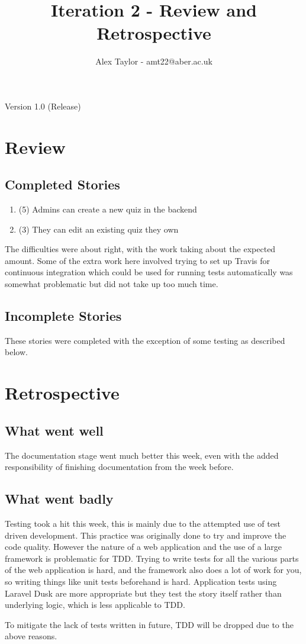 \documentclass{article}
\title{Iteration 2 - Review and Retrospective}
\author{Alex Taylor - amt22@aber.ac.uk}
\begin{document}
\maketitle
\begin{center}
	Version 1.0 (Release)
\end{center}
\thispagestyle{empty}
\newpage

\section{Review}
\subsection{Completed Stories}
\begin{enumerate}
	\item (5) Admins can create a new quiz in the backend
	\item (3) They can edit an existing quiz they own
\end{enumerate}
The difficulties were about right, with the work taking about the expected amount. Some of the extra work here involved trying to set up Travis for continuous integration which could be used for running tests automatically was somewhat problematic but did not take up too much time.
\subsection{Incomplete Stories}
These stories were completed with the exception of some testing as described below.
\newpage

\section{Retrospective}
\subsection{What went well}
The documentation stage went much better this week, even with the added responsibility of finishing documentation from the week before.
\subsection{What went badly}
Testing took a hit this week, this is mainly due to the attempted use of test driven development. This practice was originally done to try and improve the code quality. However the nature of a web application and the use of a large framework is problematic for TDD. Trying to write tests for all the various parts of the web application is hard, and the framework also does a lot of work for you, so writing things like unit tests beforehand is hard. Application tests using Laravel Dusk are more appropriate but they test the story itself rather than underlying logic, which is less applicable to TDD. 

To mitigate the lack of tests written in future, TDD will be dropped due to the above reasons.
\end{document}
